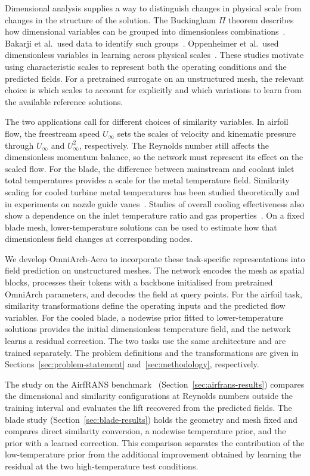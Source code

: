 \documentclass[a4paper,fleqn]{cas-sc}
\begin{document}
Dimensional analysis supplies a way to distinguish changes in physical scale from
changes in the structure of the solution. The Buckingham \(\Pi\) theorem describes
how dimensional variables can be grouped into dimensionless combinations~\citep{Buckingham1914}.
Bakarji et al.\ used data to identify such groups~\citep{Bakarji2022}.
Oppenheimer et al.\ used dimensionless variables in learning across physical
scales~\citep{Oppenheimer2023}. These studies
motivate using characteristic scales to represent both the operating conditions
and the predicted fields. For a pretrained surrogate on an unstructured mesh, the
relevant choice is which scales to account for explicitly and which variations to
learn from the available reference solutions.

The two applications call for different choices of similarity variables. In airfoil
flow, the freestream speed \(U_\infty\) sets the scales of velocity and kinematic
pressure through \(U_\infty\) and \(U_\infty^2\), respectively. The Reynolds number
still affects the dimensionless momentum balance, so the network must represent its
effect on the scaled flow. For the blade, the difference between mainstream and
coolant inlet total temperatures provides a scale for the metal temperature field.
Similarity scaling for cooled turbine metal temperatures has been studied theoretically
and in experiments on nozzle guide vanes~\citep{Luque2016,Luque2017}. Studies of overall
cooling effectiveness also show a dependence on the inlet temperature ratio and gas
properties~\citep{Cartlidge2024}. On a fixed blade mesh,
lower-temperature solutions can be used to estimate how that dimensionless field
changes at corresponding nodes.

We develop OmniArch-Aero to incorporate these task-specific representations into
field prediction on unstructured meshes. The network encodes the mesh as spatial
blocks, processes their tokens with a backbone initialised from pretrained OmniArch
parameters, and decodes the field at query points. For the airfoil task, similarity
transformations define the operating inputs and the predicted flow variables. For
the cooled blade, a nodewise prior fitted to lower-temperature solutions provides
the initial dimensionless temperature field, and the network learns a residual
correction. The two tasks use the same architecture and are trained separately.
The problem definitions and the transformations are given in
Sections~\ref{sec:problem-statement} and~\ref{sec:methodology}, respectively.

The study on the AirfRANS benchmark~\citep{Bonnet2022AirfRANS} (Section~\ref{sec:airfrans-results}) compares the dimensional and
similarity configurations at Reynolds numbers outside the training interval and
evaluates the lift recovered from the predicted fields. The blade study
(Section~\ref{sec:blade-results}) holds the geometry and mesh fixed and compares
direct similarity conversion, a nodewise temperature prior, and the prior with
a learned correction. This comparison separates the contribution of the
low-temperature prior from the additional improvement obtained by learning the
residual at the two high-temperature test conditions.
\end{document}
